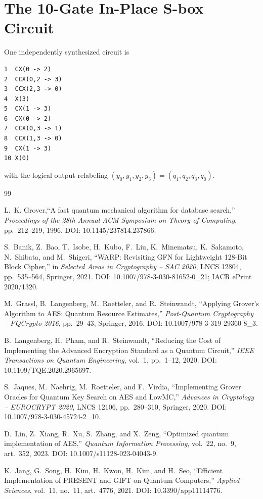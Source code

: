 \documentclass[10pt,a4paper]{article}
\begin{document}
\section{The 10-Gate In-Place S-box Circuit}
One independently synthesized circuit is
\begin{Verbatim}[fontsize=\small]
1  CX(0 -> 2)
2  CCX(0,2 -> 3)
3  CCX(2,3 -> 0)
4  X(3)
5  CX(1 -> 3)
6  CX(0 -> 2)
7  CCX(0,3 -> 1)
8  CCX(1,3 -> 0)
9  CX(1 -> 3)
10 X(0)
\end{Verbatim}
with the logical output relabeling $(y_0,y_1,y_2,y_3)=(q_1,q_2,q_3,q_0)$.

\begin{thebibliography}{99}

L.~K. Grover,``A fast quantum mechanical algorithm for database search,''
\emph{Proceedings of the 28th Annual ACM Symposium on Theory of Computing}, pp.~212--219, 1996.
DOI: 10.1145/237814.237866.

S.~Banik, Z.~Bao, T.~Isobe, H.~Kubo, F.~Liu, K.~Minematsu, K.~Sakamoto, N.~Shibata, and M.~Shigeri,
``WARP: Revisiting GFN for Lightweight 128-Bit Block Cipher,''
in \emph{Selected Areas in Cryptography -- SAC 2020}, LNCS 12804, pp.~535--564, Springer, 2021.
DOI: 10.1007/978-3-030-81652-0\_21; IACR ePrint 2020/1320.

M.~Grassl, B.~Langenberg, M.~Roetteler, and R.~Steinwandt,
``Applying Grover's Algorithm to AES: Quantum Resource Estimates,''
\emph{Post-Quantum Cryptography -- PQCrypto 2016}, pp.~29--43, Springer, 2016.
DOI: 10.1007/978-3-319-29360-8\_3.

B.~Langenberg, H.~Pham, and R.~Steinwandt,
``Reducing the Cost of Implementing the Advanced Encryption Standard as a Quantum Circuit,''
\emph{IEEE Transactions on Quantum Engineering}, vol.~1, pp.~1--12, 2020.
DOI: 10.1109/TQE.2020.2965697.

S.~Jaques, M.~Naehrig, M.~Roetteler, and F.~Virdia,
``Implementing Grover Oracles for Quantum Key Search on AES and LowMC,''
\emph{Advances in Cryptology -- EUROCRYPT 2020}, LNCS 12106, pp.~280--310, Springer, 2020.
DOI: 10.1007/978-3-030-45724-2\_10.

D.~Lin, Z.~Xiang, R.~Xu, S.~Zhang, and X.~Zeng,
``Optimized quantum implementation of AES,''
\emph{Quantum Information Processing}, vol.~22, no.~9, art.~352, 2023.
DOI: 10.1007/s11128-023-04043-9.

K.~Jang, G.~Song, H.~Kim, H.~Kwon, H.~Kim, and H.~Seo,
``Efficient Implementation of PRESENT and GIFT on Quantum Computers,''
\emph{Applied Sciences}, vol.~11, no.~11, art.~4776, 2021.
DOI: 10.3390/app11114776.


\end{thebibliography}
\end{document}
